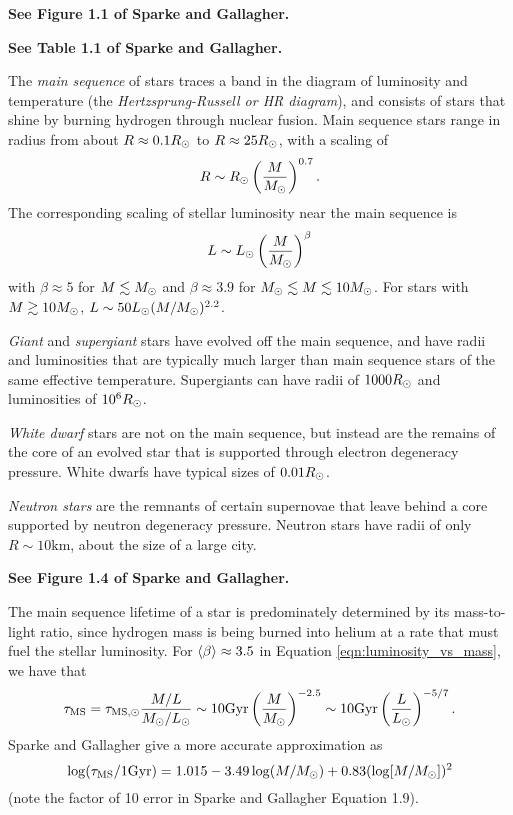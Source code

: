 \documentclass[12pt]{article}
\begin{document}
{\bf See Figure 1.1 of Sparke and Gallagher.}

{\bf See Table 1.1 of Sparke and Gallagher.}

The {\it main sequence} of stars traces a band in the diagram of luminosity and
temperature (the {\it Hertzsprung-Russell or HR diagram}), and consists of stars that
shine by burning hydrogen through nuclear fusion. Main sequence stars range in
radius from about $R\approx0.1R_{\odot}$ to $R\approx25R_{\odot}$, with a scaling of
\begin{equation}
R\sim R_{\odot}\left(\frac{M}{M_{\odot}}\right)^{0.7}.
\end{equation}
\noindent
The corresponding scaling of stellar luminosity near the main sequence is
\begin{equation}
\label{eqn:luminosity_vs_mass}
L\sim L_{\odot}\left(\frac{M}{M_{\odot}}\right)^{\beta}
\end{equation}
\noindent
with $\beta\approx5$ for $M\lesssim M_{\odot}$ and 
$\beta\approx3.9$ for $M_{\odot}\lesssim M \lesssim 10M_{\odot}$. For stars
with $M\gtrsim10M_{\odot}$, $L\sim50L_{\odot}(M/M_{\odot})^{2.2}$.

{\it Giant} and {\it supergiant} stars have evolved off the main sequence, and
have radii and luminosities that are typically much larger than main sequence
stars of the same effective temperature. Supergiants can have radii of $1000R_{\odot}$
and luminosities of $10^{6}R_{\odot}$.

{\it White dwarf} stars are not on the main sequence, but instead are the
remains of the core of an evolved star that is supported through electron
degeneracy pressure. White dwarfs have typical sizes of $0.01R_{\odot}$.

{\it Neutron stars} are the remnants of certain supernovae that leave behind
a core supported by neutron degeneracy pressure. Neutron stars have radii 
of only $R\sim10\mathrm{km}$, about the size of a large city.

{\bf See Figure 1.4 of Sparke and Gallagher.}

The main sequence lifetime of a star is predominately determined by its
mass-to-light ratio, since hydrogen mass is being burned into helium at a 
rate that must fuel the stellar luminosity. For $\langle\beta\rangle \approx 3.5$ in
Equation \ref{eqn:luminosity_vs_mass}, we have that
\begin{equation}
\label{eqn:main_sequence_lifetime_basic}
\tau_{\mathrm{MS}} = \tau_{\mathrm{MS},\odot}\frac{M/L}{M_{\odot}/L_{\odot}} \sim 10\mathrm{Gyr}\left(\frac{M}{M_{\odot}}\right)^{-2.5}\sim 10\mathrm{Gyr}\left(\frac{L}{L_{\odot}}\right)^{-5/7}.
\end{equation}
Sparke and Gallagher give a more accurate approximation as
\begin{equation}
\label{eqn:main_sequence_lifetime}
\log(\tau_{\mathrm{MS}}/1\mathrm{Gyr}) = 1.015 - 3.49\log(M/M_{\odot}) +0.83(\log[M/M_{\odot}])^2
\end{equation}
\noindent
(note the factor of 10 error in Sparke and Gallagher Equation 1.9).
\end{document}
